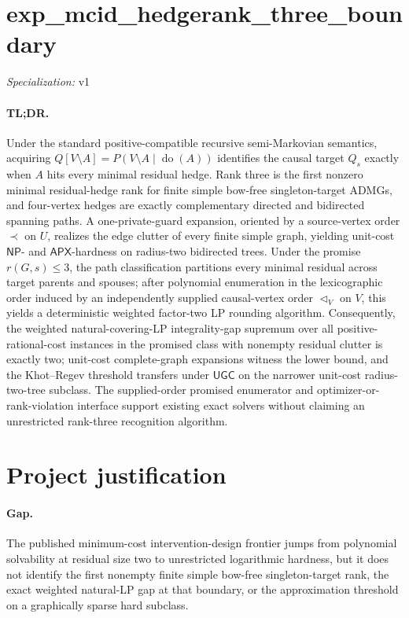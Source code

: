 \documentclass{article}
\begin{document}
\sloppy

\section*{exp\_\allowbreak{}mcid\_\allowbreak{}hedgerank\_\allowbreak{}three\_\allowbreak{}boundary}

\noindent\textit{Specialization:} v1\par

\paragraph{TL;DR.} Under the standard positive-compatible recursive semi-Markovian semantics, acquiring \(Q[V\setminus A]=P(V\setminus A\mid\operatorname{do}(A))\) identifies the causal target \(Q_s\) exactly when \(A\) hits every minimal residual hedge. Rank three is the first nonzero minimal residual-hedge rank for finite simple bow-free singleton-target ADMGs, and four-vertex hedges are exactly complementary directed and bidirected spanning paths. A one-private-guard expansion, oriented by a source-vertex order \(\prec\) on \(U\), realizes the edge clutter of every finite simple graph, yielding unit-cost \(\mathsf{NP}\)- and \(\mathsf{APX}\)-hardness on radius-two bidirected trees. Under the promise \(r(G,s)\leq3\), the path classification partitions every minimal residual across target parents and spouses; after polynomial enumeration in the lexicographic order induced by an independently supplied causal-vertex order \(\triangleleft_V\) on \(V\), this yields a deterministic weighted factor-two LP rounding algorithm. Consequently, the weighted natural-covering-LP integrality-gap supremum over all positive-rational-cost instances in the promised class with nonempty residual clutter is exactly two; unit-cost complete-graph expansions witness the lower bound, and the Khot--Regev threshold transfers under \(\mathsf{UGC}\) on the narrower unit-cost radius-two-tree subclass. The supplied-order promised enumerator and optimizer-or-rank-violation interface support existing exact solvers without claiming an unrestricted rank-three recognition algorithm.

\section{Project justification}

\paragraph{Gap.} The published minimum-cost intervention-design frontier jumps from polynomial solvability at residual size two to unrestricted logarithmic hardness, but it does not identify the first nonempty finite simple bow-free singleton-target rank, the exact weighted natural-LP gap at that boundary, or the approximation threshold on a graphically sparse hard subclass.
\end{document}
